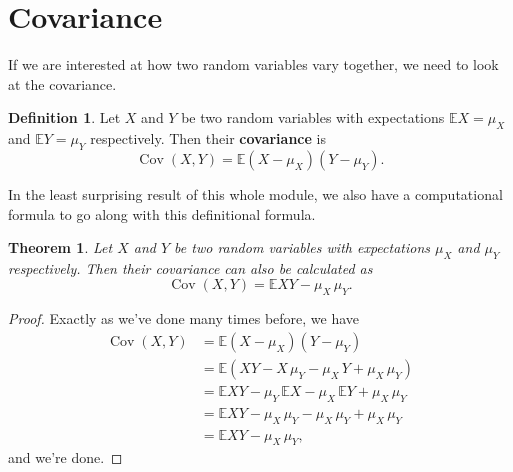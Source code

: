 \documentclass[
  a4paper,
]{book}
\newtheorem{theorem}{Theorem}[chapter]
\theoremstyle{definition}
\newtheorem{definition}{Definition}[chapter]
\theoremstyle{definition}
\theoremstyle{definition}
\theoremstyle{definition}
\theoremstyle{remark}
\begin{document}
\hypertarget{covariance}{%
\section{Covariance}\label{covariance}}

If we are interested at how two random variables vary together, we need to look at the covariance.

\newcommand{\Cov}{\operatorname{Cov}}
\newcommand{\Corr}{\operatorname{Corr}}

\begin{definition}
Let \(X\) and \(Y\) be two random variables with expectations \(\mathbb EX =\mu_X\) and \(\mathbb EY = \mu_Y\) respectively. Then their \textbf{covariance} is
\[ \operatorname{Cov}(X,Y) = \mathbb E(X - \mu_X)(Y - \mu_Y) . \]
\end{definition}

In the least surprising result of this whole module, we also have a computational formula to go along with this definitional formula.

\begin{theorem}
Let \(X\) and \(Y\) be two random variables with expectations \(\mu_X\) and \(\mu_Y\) respectively. Then their covariance can also be calculated as
\[ \operatorname{Cov}(X,Y) = \mathbb EXY - \mu_X\, \mu_Y . \]
\end{theorem}

\begin{proof}
Exactly as we've done many times before, we have
\begin{align*}
\operatorname{Cov}(X,Y) &= \mathbb E(X - \mu_X)(Y - \mu_Y) \\
&= \mathbb E(XY - X\,\mu_Y - \mu_X\, Y + \mu_X\,\mu_Y) \\
&= \mathbb EXY  - \mu_Y \,\mathbb EX - \mu_X \,\mathbb EY + \mu_X \, \mu_Y \\
&= \mathbb EXY - \mu_X \, \mu_Y - \mu_X \, \mu_Y + \mu_X \, \mu_Y \\
&= \mathbb EXY - \mu_X \, \mu_Y ,
\end{align*}
and we're done.
\end{proof}
\end{document}
